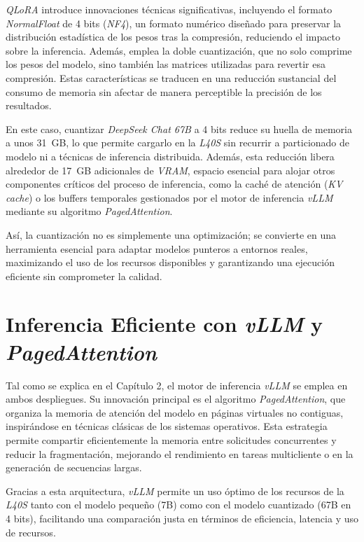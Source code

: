 \textit{QLoRA} introduce innovaciones técnicas significativas, incluyendo el formato \textit{NormalFloat} de 4 bits (\textit{NF4}), un formato numérico diseñado para preservar la distribución estadística de los pesos tras la compresión, reduciendo el impacto sobre la inferencia. Además, emplea la doble cuantización, que no solo comprime los pesos del modelo, sino también las matrices utilizadas para revertir esa compresión. Estas características se traducen en una reducción sustancial del consumo de memoria sin afectar de manera perceptible la precisión de los resultados.

En este caso, cuantizar \textit{DeepSeek Chat 67B} a 4 bits reduce su huella de memoria a unos 31~GB, lo que permite cargarlo en la \textit{L40S} sin recurrir a particionado de modelo ni a técnicas de inferencia distribuida. Además, esta reducción libera alrededor de 17~GB adicionales de \textit{VRAM}, espacio esencial para alojar otros componentes críticos del proceso de inferencia, como la caché de atención (\textit{KV cache}) o los buffers temporales gestionados por el motor de inferencia \textit{vLLM} mediante su algoritmo \textit{PagedAttention}.

Así, la cuantización no es simplemente una optimización; se convierte en una herramienta esencial para adaptar modelos punteros a entornos reales, maximizando el uso de los recursos disponibles y garantizando una ejecución eficiente sin comprometer la calidad.

\section{Inferencia Eficiente con \textit{vLLM} y \textit{PagedAttention}}
Tal como se explica en el Capítulo 2, el motor de inferencia \textit{vLLM} se emplea en ambos despliegues. Su innovación principal es el algoritmo \textit{PagedAttention}, que organiza la memoria de atención del modelo en páginas virtuales no contiguas, inspirándose en técnicas clásicas de los sistemas operativos. Esta estrategia permite compartir eficientemente la memoria entre solicitudes concurrentes y reducir la fragmentación, mejorando el rendimiento en tareas multicliente o en la generación de secuencias largas.

Gracias a esta arquitectura, \textit{vLLM} permite un uso óptimo de los recursos de la \textit{L40S} tanto con el modelo pequeño (7B) como con el modelo cuantizado (67B en 4 bits), facilitando una comparación justa en términos de eficiencia, latencia y uso de recursos.

